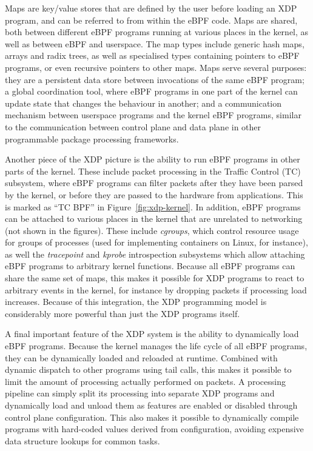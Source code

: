 \documentclass[10pt,sigconf]{acmart}
\begin{document}
Maps are key/value stores that are defined by the user before loading an XDP
program, and can be referred to from within the eBPF code. Maps are shared, both
between different eBPF programs running at various places in the kernel, as well
as between eBPF and userspace. The map types include generic hash maps, arrays
and radix trees, as well as specialised types containing pointers to eBPF
programs, or even recursive pointers to other maps. Maps serve several purposes:
they are a persistent data store between invocations of the same eBPF program; a
global coordination tool, where eBPF programs in one part of the kernel can
update state that changes the behaviour in another; and a communication
mechanism between userspace programs and the kernel eBPF programs, similar to
the communication between control plane and data plane in other programmable
package processing frameworks.

Another piece of the XDP picture is the ability to run eBPF programs in other
parts of the kernel. These include packet processing in the Traffic Control (TC)
subsystem, where eBPF programs can filter packets after they have been parsed by
the kernel, or before they are passed to the hardware from applications. This is
marked as ``TC BPF'' in Figure~\ref{fig:xdp-kernel}. In addition, eBPF programs
can be attached to various places in the kernel that are unrelated to networking
(not shown in the figures). These include \emph{cgroups}, which control resource
usage for groups of processes (used for implementing containers on Linux, for
instance), as well the \emph{tracepoint} and \emph{kprobe} introspection
subsystems which allow attaching eBPF programs to arbitrary kernel functions.
Because all eBPF programs can share the same set of maps, this makes it possible
for XDP programs to react to arbitrary events in the kernel, for instance by
dropping packets if processing load increases. Because of this integration, the
XDP programming model is considerably more powerful than just the XDP programs
itself.

A final important feature of the XDP system is the ability to dynamically load
eBPF programs. Because the kernel manages the life cycle of all eBPF programs,
they can be dynamically loaded and reloaded at runtime. Combined with dynamic
dispatch to other programs using tail calls, this makes it possible to limit the
amount of processing actually performed on packets. A processing pipeline can
simply split its processing into separate XDP programs and dynamically load and
unload them as features are enabled or disabled through control plane
configuration. This also makes it possible to dynamically compile programs with
hard-coded values derived from configuration, avoiding expensive data structure
lookups for common tasks.
\end{document}
